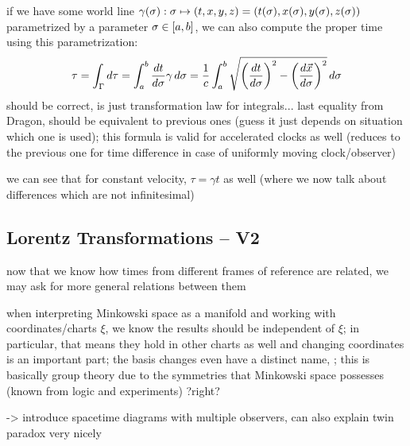 if we have some world line $\gamma(\sigma): \sigma \mapsto \qty(t, x, y, z) = \qty(t(\sigma), x(\sigma), y(\sigma), z(\sigma))$ parametrized by a parameter $\sigma \in \qty[a, b]$, we can also compute the proper time using this parametrization:
\begin{equation}
\tau = \int_\Gamma d\tau = \int_a^b \dv{t}{\sigma} \gamma \, d\sigma = \frac{1}{c} \int_a^b \sqrt{\qty(\dv{t}{\sigma})^2 - \qty(\dv{\vec{x}}{\sigma})^2} \, d\sigma
\end{equation}
should be correct, is just transformation law for integrals... last equality from Dragon, should be equivalent to previous ones (guess it just depends on situation which one is used); this formula is valid for accelerated clocks as well (reduces to the previous one for time difference in case of uniformly moving clock/observer)


we can see that for constant velocity, $\tau = \gamma t$ as well (where we now talk about differences which are not infinitesimal)



		\subsection{Lorentz Transformations -- V2}
now that we know how times from different frames of reference are related, we may ask for more general relations between them


when interpreting Minkowski space as a manifold and working with coordinates/charts $\xi$, we know the results should be independent of $\xi$; in particular, that means they hold in other charts as well and changing coordinates is an important part; the basis changes even have a distinct name, ; this is basically group theory due to the symmetries that Minkowski space possesses (known from logic and experiments) ?right?





-> introduce spacetime diagrams with multiple observers, can also explain twin paradox very nicely


